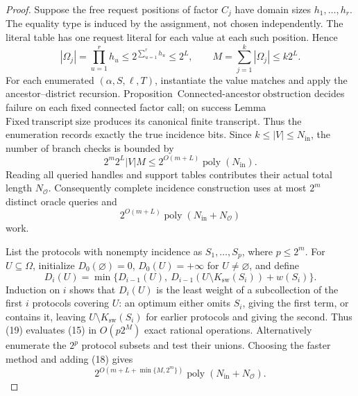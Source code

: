 \documentclass{article}
\begin{document}
\begin{proof}
Suppose the free request positions of factor \(C_j\) have domain sizes \(h_1,\ldots,h_r\).  The equality type is induced by the assignment, not chosen independently.  The literal table has one request literal for each value at each such position.  Hence
\[
 |\Omega_j|=\prod_{u=1}^{r}h_u
 \leq 2^{\sum_{u=1}^{r}h_u}
 \leq 2^L,
 \qquad
 M=\sum_{j=1}^{k}|\Omega_j|\leq k2^L.
 \tag{16}
\]
For each enumerated \((\alpha,S,\ell,T)\), instantiate the value matches and apply the ancestor--district recursion.  Proposition~\(\mathrm{Connected\mbox{-}ancestor\ obstruction}\) decides failure on each fixed connected factor call; on success Lemma~\(\mathrm{Fixed\ transcript\ size}\) produces its canonical finite transcript.  Thus the enumeration records exactly the true incidence bits.  Since \(k\leq |V|\leq N_{\mathrm{in}}\), the number of branch checks is bounded by
\[
 2^m2^L|V|M
 \leq 2^{O(m+L)}\operatorname{poly}(N_{\mathrm{in}}).
 \tag{17}
\]
Reading all queried handles and support tables contributes their actual total length \(N_{\mathcal O}\).  Consequently complete incidence construction uses at most \(2^m\) distinct oracle queries and
\[
 2^{O(m+L)}\operatorname{poly}(N_{\mathrm{in}}+N_{\mathcal O})
 \tag{18}
\]
work.

List the protocols with nonempty incidence as \(S_1,\ldots,S_p\), where \(p\leq2^m\).  For \(U\subseteq\Omega\), initialize \(D_0(\varnothing)=0\), \(D_0(U)=+\infty\) for \(U\ne\varnothing\), and define
\[
 D_i(U)=\min\{D_{i-1}(U),\ D_{i-1}(U\setminus K_{\mathrm{sw}}(S_i))+w(S_i)\}.
 \tag{19}
\]
Induction on \(i\) shows that \(D_i(U)\) is the least weight of a subcollection of the first \(i\) protocols covering \(U\): an optimum either omits \(S_i\), giving the first term, or contains it, leaving \(U\setminus K_{\mathrm{sw}}(S_i)\) for earlier protocols and giving the second.  Thus (19) evaluates (15) in \(O(p2^M)\) exact rational operations.  Alternatively enumerate the \(2^p\) protocol subsets and test their unions.  Choosing the faster method and adding (18) gives
\[
 2^{O(m+L+\min\{M,2^m\})}
 \operatorname{poly}(N_{\mathrm{in}}+N_{\mathcal O}).
 \tag{20}
\]


\end{proof}
\end{document}
